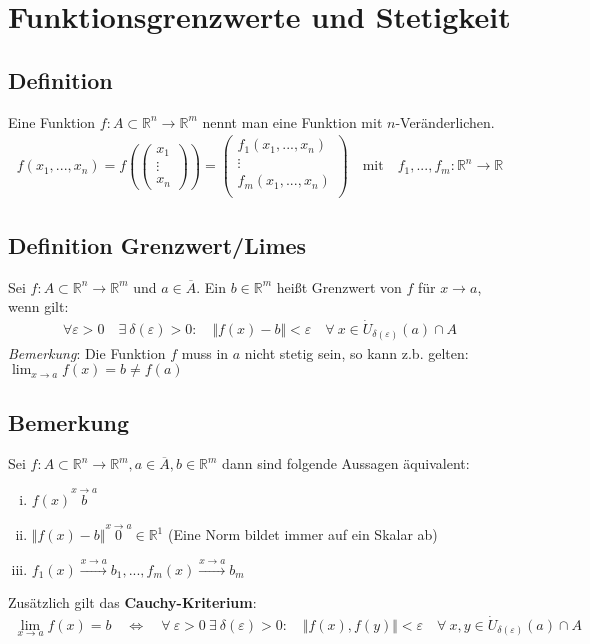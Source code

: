 \documentclass[11pt,a4paper]{book}
\newcommand {\R}	{\mathbb{R}}
\newcommand {\Rn}	{\mathbb{R}^n}
\newcommand {\Rm}	{\mathbb{R}^m}
\newcommand{\1}    	{\mathbbm{1}}
\begin{document}
\section{Funktionsgrenzwerte und Stetigkeit}

\subsection{Definition}
Eine Funktion \(f : A \subset \Rn \rightarrow \Rm \) nennt man eine Funktion mit \(n\)-Veränderlichen.
\begin{align*}
	f(x_1, ..., x_n) = f( \left( \begin{array}{c} x_1 \\ \vdots \\ x_n \end{array} \right) ) = \left( \begin{array}{c}
		f_1(x_1, ..., x_n) \\
		\vdots \\
		f_m(x_1, ..., x_n) \\
	\end{array} \right) \quad \textrm{mit} \quad f_1, ..., f_m : \Rn \rightarrow \R
\end{align*}

\subsection{Definition Grenzwert/Limes}
Sei \(f : A \subset \Rn \rightarrow \Rm \) und \(a \in \overline{A}\). Ein \(b \in \Rm\) heißt Grenzwert von \(f\) für \(x \rightarrow a\), wenn gilt:
\begin{align*}
	\forall \varepsilon > 0 \quad \exists~ \delta(\varepsilon) > 0 : \quad \Vert f(x) - b \Vert < \varepsilon \quad \forall~ x \in \dot{U}_{\delta(\varepsilon)}(a) \cap A
\end{align*}
\textit{Bemerkung}: Die Funktion \(f\) muss in \(a\) nicht stetig sein, so kann z.b. gelten: \\
\( \lim_{x \rightarrow a} f(x) = b \neq f(a) \)

\subsection{Bemerkung}
Sei \(f : A \subset \Rn \rightarrow \Rm, a \in \overline{A}, b \in \Rm\) dann sind folgende Aussagen äquivalent:
\begin{enumerate}[(i)]
	\item \( f(x) \stackrel{x \rightarrow a} b \)
	\item \( \Vert f(x) - b \Vert \stackrel{x \rightarrow a} 0 \in \R^1 \) (Eine Norm bildet immer auf ein Skalar ab)
	\item \( f_1(x) \stackrel{x \rightarrow a}{\rightarrow} b_1, ..., f_m(x) \stackrel{x \rightarrow a}{\rightarrow} b_m \)
\end{enumerate}
Zusätzlich gilt das \textbf{Cauchy-Kriterium}:
\begin{align*}
	\lim_{x \rightarrow a} f(x) = b \quad \Leftrightarrow \quad \forall~ \varepsilon > 0 ~ \exists~ \delta(\varepsilon) > 0: \quad 
	\Vert f(x), f(y) \Vert < \varepsilon \quad \forall~ x,y \in \dot{U}_{\delta(\varepsilon)}(a) \cap A
\end{align*}
\end{document}
